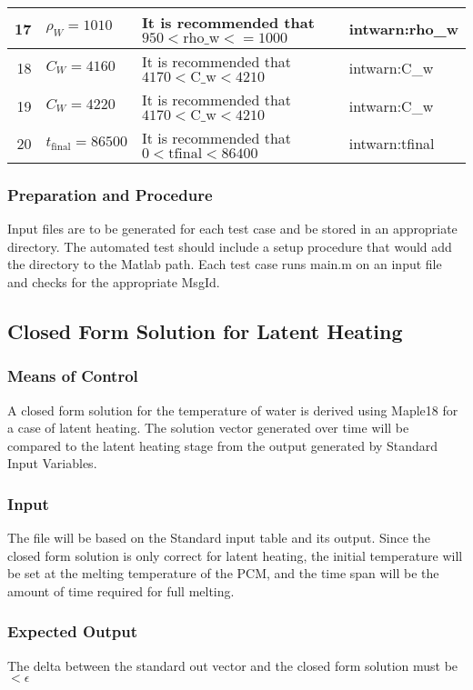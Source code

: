 \documentclass[12pt]{article}
\begin{document}
\begin{center}
\begin{longtable}{ | r | p{3cm} | p{5cm} | p{4cm} |}
	17 & $\rho_W = 1010$ & It is recommended that $950 < \text{rho\_{w}} <= 1000$ & intwarn:rho\_{w} \\ \hline
	18 & $C_W = 4160$ & It is recommended that $4170 < \text{C\_{w}} < 4210$ & intwarn:C\_{w} \\ \hline
	19 & $C_W = 4220$ & It is recommended that $4170 < \text{C\_{w}} < 4210$ & intwarn:C\_{w} \\ \hline
	20 & $t_{\text{final}} = 86500$ & It is recommended that $0 < \text{tfinal} < 86400$ & intwarn:tfinal \\ \hline
	\end{longtable}
\end{center}

\subsubsection{Preparation and Procedure}
Input files are to be generated for each test case and be stored in an appropriate
 directory. The automated test should include a setup procedure that would add 
 the directory to the Matlab path. Each test case runs main.m on an input file
  and checks for the appropriate MsgId. 

\subsection{Closed Form Solution for Latent Heating}
\subsubsection{Means of Control}
A closed form solution for the temperature of water is derived using Maple18 for
a case of latent heating. The solution vector generated over time will be 
compared to the latent heating stage from the output generated by Standard Input Variables.
\subsubsection{Input}
The file will be based on the Standard input table and its output. Since the closed
 form solution is only correct for latent heating, the initial temperature will
  be set at the melting temperature of the PCM, and the time span will be the 
  amount of time required for full melting.

\subsubsection{Expected Output}
The delta between the standard out vector and the closed form solution must be 
$< \epsilon$
\end{document}
